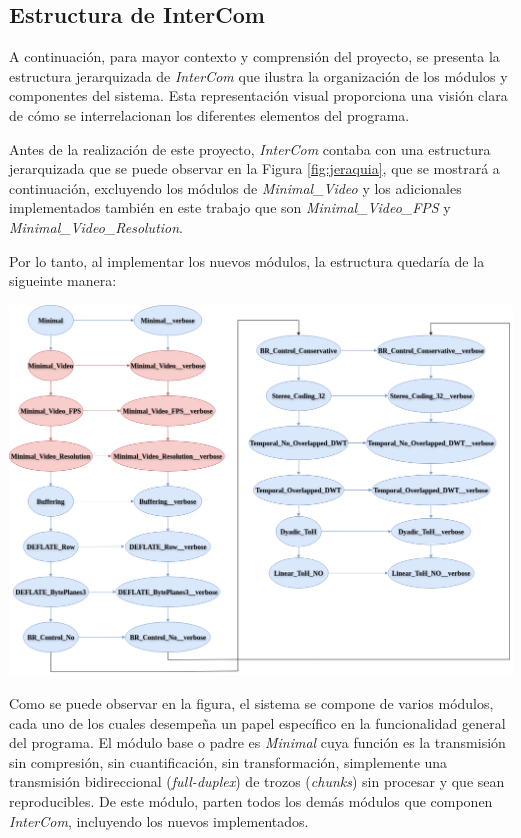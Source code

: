 \subsection{Estructura de InterCom}

A continuación, para mayor contexto y comprensión del proyecto, se presenta la estructura jerarquizada de \textit{InterCom} que ilustra la organización de los módulos y componentes del sistema. Esta representación visual proporciona una visión clara de cómo se interrelacionan los diferentes elementos del programa.
\vspace{\baselineskip}

Antes de la realización de este proyecto, \textit{InterCom} contaba con una estructura jerarquizada que se puede observar en la Figura \ref{fig:jeraquia}, que se mostrará a continuación, excluyendo los módulos de \textit{Minimal\_Video} y los adicionales implementados también en este trabajo que son \textit{Minimal\_Video\_FPS} y \\
\textit{Minimal\_Video\_Resolution}. 

\vspace{\baselineskip}
Por lo tanto, al implementar los nuevos módulos, la estructura quedaría de la sigueinte manera:

\begin{center}
	\includegraphics[width = 1.01\textwidth]{images/jerarquia_modulos.png}
	\label{fig:jeraquia}
\end{center}

\vspace{\baselineskip}
Como se puede observar en la figura, el sistema se compone de varios módulos, cada uno de los cuales desempeña un papel específico en la funcionalidad general del programa. El módulo base o padre es \textit{Minimal} cuya función es la transmisión sin compresión, sin cuantificación, sin transformación, simplemente una transmisión bidireccional (\textit{full-duplex}) de trozos (\textit{chunks}) sin procesar y que sean reproducibles. De este módulo, parten todos los demás módulos que componen \textit{InterCom}, incluyendo los nuevos implementados. 
\vspace{\baselineskip}


